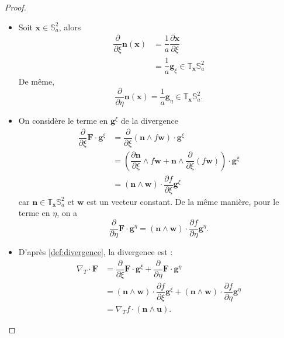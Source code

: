 \begin{proof}
\begin{itemize}
\item Soit $\mathbf{x} \in \mathbb{S}_a^2$, alors 
\begin{align*}
\dfrac{\partial}{\partial \xi} \mathbf{n}(\mathbf{x}) & = \dfrac{1}{a} \dfrac{\partial \mathbf{x}}{\partial \xi} \\
		& = \dfrac{1}{a} \mathbf{g}_{\xi} \in \mathbb{T}_{\mathbf{x}} \mathbb{S}_a^2
\end{align*}
De même, 
\begin{equation*}
\dfrac{\partial}{\partial \eta} \mathbf{n}(\mathbf{x})= \dfrac{1}{a} \mathbf{g}_{\eta} \in \mathbb{T}_{\mathbf{x}} \mathbb{S}_a^2.
\end{equation*}

\item On considère le terme en $\mathbf{g}^\xi$ de la divergence
\begin{align*}
\dfrac{\partial}{\partial \xi} \mathbf{F} \cdot \mathbf{g}^{\xi} & = \dfrac{\partial}{\partial \xi} \left( \mathbf{n} \wedge f \mathbf{w} \right) \cdot \mathbf{g}^{\xi} \\
	& = \left( \dfrac{\partial \mathbf{n}}{\partial \xi} \wedge f \mathbf{w} + \mathbf{n} \wedge  \dfrac{\partial}{\partial \xi} \left( f \mathbf{w} \right) \right) \cdot \mathbf{g}^{\xi} \\
	& = \left( \mathbf{n} \wedge \mathbf{w} \right) \cdot \dfrac{\partial f}{\partial \xi} \mathbf{g}^{\xi}
\end{align*}
car $\mathbf{n} \in \mathbb{T}_{\mathbf{x}} \mathbb{S}_a^2$ et $\mathbf{w}$ est un vecteur constant.
De la même manière, pour le terme en $\eta$, on a 
\begin{equation*}
\dfrac{\partial}{\partial \eta} \mathbf{F} \cdot \mathbf{g}^{\eta} = \left( \mathbf{n} \wedge \mathbf{w} \right) \cdot \dfrac{\partial f}{\partial \eta} \mathbf{g}^{\eta}.
\end{equation*}

\item D'après \eqref{def:divergence}, la divergence est :
\begin{align*}
\nabla_T \cdot \mathbf{F} & = \dfrac{\partial}{\partial \xi} \mathbf{F} \cdot \mathbf{g}^{\xi} + \dfrac{\partial}{\partial \eta} \mathbf{F} \cdot \mathbf{g}^{\eta}\\
	& = \left( \mathbf{n} \wedge \mathbf{w} \right) \cdot \dfrac{\partial f}{\partial \xi} \mathbf{g}^{\xi} + \left( \mathbf{n} \wedge \mathbf{w} \right) \cdot \dfrac{\partial f}{\partial \eta} \mathbf{g}^{\eta}\\
	& = \nabla_T f \cdot \left( \mathbf{n} \wedge \mathbf{u} \right).
\end{align*}
\end{itemize}
\end{proof}
